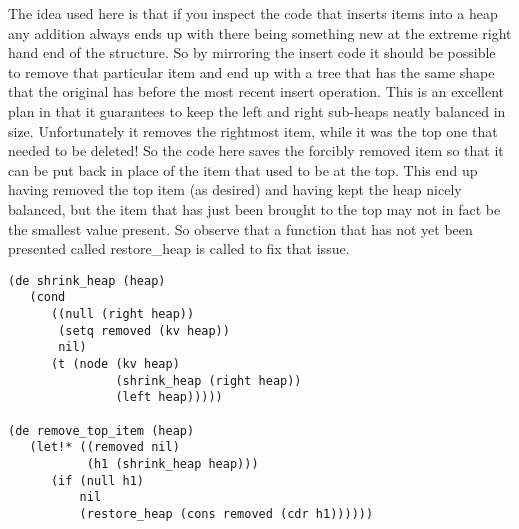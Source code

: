 The idea used here is that if you inspect the code that inserts items into
a heap any addition always ends up with there being something new at the
extreme right hand end of the structure. So by mirroring the insert code
it should be possible to remove that particular item and end up with a
tree that has the same shape that the original has before the most recent
insert operation. This is an excellent plan in that it guarantees to keep
the left and right sub-heaps neatly balanced in size. Unfortunately it
removes the rightmost item, while it was the top one that needed to be
deleted! So the code here saves the forcibly removed item so that it can be
put back in place of the item that used to be at the top. This end up having
removed the top item (as desired) and having kept the heap nicely
balanced, but the item that has just been brought to the top may not
in fact be the smallest value present. So observe that a function that has
not yet been presented called {\tx restore\_heap} is called to fix that
issue.
{\small\begin{verbatim}
(de shrink_heap (heap)
   (cond
      ((null (right heap))
       (setq removed (kv heap))
       nil)
      (t (node (kv heap)
               (shrink_heap (right heap))
               (left heap)))))

(de remove_top_item (heap)
   (let!* ((removed nil)
           (h1 (shrink_heap heap)))
      (if (null h1)
          nil
          (restore_heap (cons removed (cdr h1))))))
\end{verbatim}}

